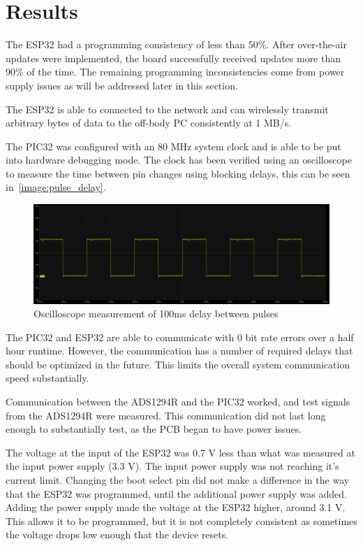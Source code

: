 \section{Results}
The ESP32 had a programming consistency of less than 50\%.
After over-the-air updates were implemented, the board successfully received updates more than 90\% of the time.
The remaining programming inconsistencies come from power supply issues as will be addressed later in this section.

The ESP32 is able to connected to the network and can wirelessly transmit arbitrary bytes of data to the off-body PC consistently at 1 MB/s.

The PIC32 was configured with an 80 MHz system clock and is able to be put into hardware debugging mode.
The clock has been verified using an oscilloscope to measure the time between pin changes using blocking delays,
this can be seen in~\autoref{image:pulse_delay}.

\begin{figure}[!ht]
  \caption{Oscilloscope measurement of 100ms delay between pulses}\label{image:pulse_delay}
  \centering
  \includegraphics[width=1\columnwidth]{chapters/development/results/DELAY}
\end{figure}

The PIC32 and ESP32 are able to communicate with 0 bit rate errors over a half hour runtime.
However, the communication has a number of required delays that should be optimized in the future.
This limits the overall system communication speed substantially.

Communication between the ADS1294R and the PIC32 worked, and test signals from the ADS1294R were measured.
This communication did not last long enough to substantially test, as the PCB began to have power issues.

The voltage at the input of the ESP32 was 0.7 V less than what was measured at the input power supply (3.3 V).
The input power supply was not reaching it's current limit.
Changing the boot select pin did not make a difference in the way that the ESP32 was programmed, until the additional power supply was added.
Adding the power supply made the voltage at the ESP32 higher, around 3.1 V.
This allows it to be programmed, but it is not completely consistent as sometimes the voltage drops low enough that the device resets.


